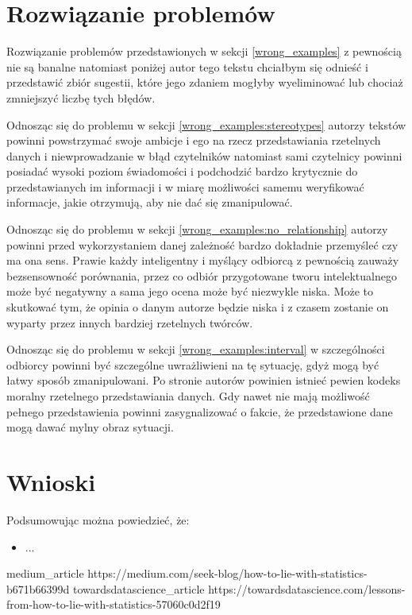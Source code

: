 \documentclass{classrep}
\begin{document}
    \section{Rozwiązanie problemów}
    \label{good_examples}{
        Rozwiązanie problemów przedstawionych w sekcji \ref{wrong_examples} z pewnością
        nie są banalne natomiast poniżej autor tego tekstu chciałbym się
        odnieść i przedstawić zbiór sugestii, które jego zdaniem mogłyby wyeliminować
        lub chociaż zmniejszyć liczbę tych błędów.

        Odnosząc się do problemu w sekcji \ref{wrong_examples:stereotypes} autorzy
        tekstów powinni powstrzymać swoje ambicje i ego na rzecz przedstawiania
        rzetelnych danych i niewprowadzanie w błąd czytelników natomiast sami
        czytelnicy powinni posiadać wysoki poziom świadomości i podchodzić bardzo
        krytycznie do przedstawianych im informacji i w miarę możliwości samemu
        weryfikować informacje, jakie otrzymują, aby nie dać się zmanipulować.

        Odnosząc się do problemu w sekcji \ref{wrong_examples:no_relationship} autorzy
        powinni przed wykorzystaniem danej zależność bardzo dokładnie przemyśleć czy ma
        ona sens. Prawie każdy inteligentny i myślący odbiorcą z pewnością zauważy
        bezsensowność porównania, przez co odbiór przygotowane tworu intelektualnego może
        być negatywny a sama jego ocena może być niezwykle niska. Może to skutkować
        tym, że opinia o danym autorze będzie niska i z czasem zostanie on wyparty
        przez innych bardziej rzetelnych twórców.

        Odnosząc się do problemu w sekcji \ref{wrong_examples:interval} w szczególności
        odbiorcy powinni być szczególne uwrażliwieni na tę sytuację, gdyż mogą być łatwy
        sposób zmanipulowani. Po stronie autorów powinien istnieć pewien kodeks moralny
        rzetelnego przedstawiania danych. Gdy nawet nie mają możliwość pełnego
        przedstawienia powinni zasygnalizować o fakcie, że przedstawione dane mogą dawać
        mylny obraz sytuacji.
    }

    \section{Wnioski} {
        Podsumowując można powiedzieć, że:
        \begin{itemize}
            \item ...

        \end{itemize}
    }

    \begin{thebibliography}{0}
        \bibitem
        {medium_article}
        {https://medium.com/seek-blog/how-to-lie-with-statistics-b671b66399d}
        \bibitem
        {towardsdatascience_article}
        {https://towardsdatascience.com/lessons-from-how-to-lie-with-statistics-57060c0d2f19}
    \end{thebibliography}
\end{document}
